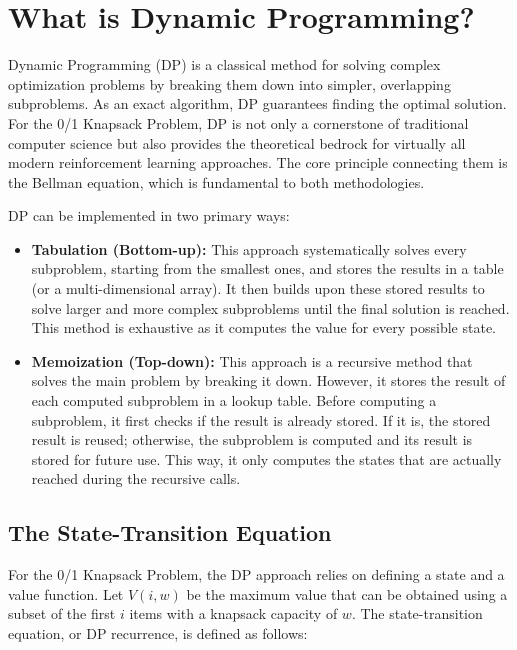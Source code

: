 \section{What is Dynamic Programming?}
\label{sec:dp}

Dynamic Programming (DP) is a classical method for solving complex optimization problems by breaking them down into simpler, overlapping subproblems. As an exact algorithm, DP guarantees finding the optimal solution. For the 0/1 Knapsack Problem, DP is not only a cornerstone of traditional computer science but also provides the theoretical bedrock for virtually all modern reinforcement learning approaches. The core principle connecting them is the Bellman equation, which is fundamental to both methodologies.

DP can be implemented in two primary ways:

\begin{itemize}
    \item \textbf{Tabulation (Bottom-up):} This approach systematically solves every subproblem, starting from the smallest ones, and stores the results in a table (or a multi-dimensional array). It then builds upon these stored results to solve larger and more complex subproblems until the final solution is reached. This method is exhaustive as it computes the value for every possible state.

    \item \textbf{Memoization (Top-down):} This approach is a recursive method that solves the main problem by breaking it down. However, it stores the result of each computed subproblem in a lookup table. Before computing a subproblem, it first checks if the result is already stored. If it is, the stored result is reused; otherwise, the subproblem is computed and its result is stored for future use. This way, it only computes the states that are actually reached during the recursive calls.
\end{itemize}

\subsection{The State-Transition Equation}

For the 0/1 Knapsack Problem, the DP approach relies on defining a state and a value function. Let \(V(i, w)\) be the maximum value that can be obtained using a subset of the first \(i\) items with a knapsack capacity of \(w\). The state-transition equation, or DP recurrence, is defined as follows:

